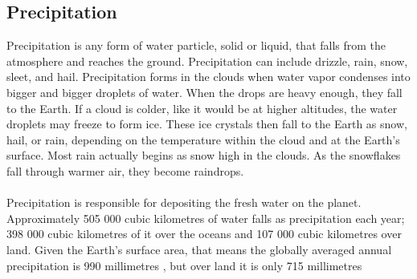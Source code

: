 \subsection{Precipitation}
Precipitation is any form of water particle, solid or liquid, that falls from the atmosphere and reaches the ground. Precipitation can include drizzle, rain, snow, sleet, and hail. Precipitation forms in the clouds when water vapor condenses into bigger and bigger droplets of water. When the drops are heavy enough, they fall to the Earth. If a cloud is colder, like it would be at higher altitudes, the water droplets may freeze to form ice. These ice crystals then fall to the Earth as snow, hail, or rain, depending on the temperature within the cloud and at the Earth's surface. Most rain actually begins as snow high in the clouds. As the snowflakes fall through warmer air, they become raindrops. \\\\
Precipitation is responsible for depositing the fresh water on the planet. Approximately 505 000 cubic kilometres of water falls as precipitation each year; 398 000 cubic kilometres of it over the oceans and 107 000 cubic kilometres over land.\cite{ghassemi1995salinization} Given the Earth's surface area, that means the globally averaged annual precipitation is 990 millimetres , but over land it is only 715 millimetres
